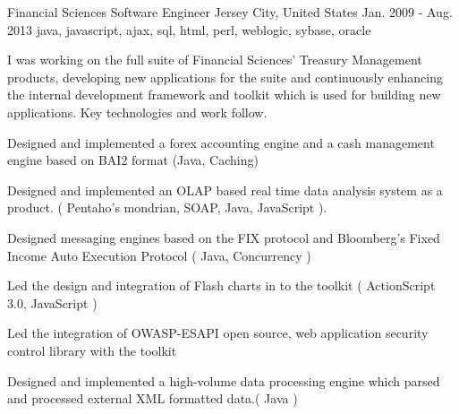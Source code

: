 \cventry
    {Financial Sciences} %
    {Software Engineer} %
    {Jersey City, United States} %
    {Jan. 2009 - Aug. 2013} %
    {java, javascript, ajax, sql, html, perl, weblogic, sybase, oracle} %
    {
        I was working on the full suite of Financial Sciences' Treasury Management products, developing new applications for the suite and continuously enhancing the
        internal development framework and toolkit which is used for building new applications. Key technologies and work follow.
    \begin{cvitems} %
        \item { Designed and implemented a forex accounting engine and a cash management engine based on BAI2 format (Java, Caching)}
        \item { Designed and implemented an OLAP based real time data analysis system as a product. ( Pentaho's mondrian, SOAP, Java, JavaScript ).}
        \item { Designed messaging engines based on the FIX protocol and Bloomberg's Fixed Income Auto Execution Protocol ( Java, Concurrency )}
        \item { Led the design and integration of Flash charts in to the toolkit ( ActionScript 3.0, JavaScript )}
        \item { Led the integration of OWASP-ESAPI open source, web application security control library with the toolkit}
        \item { Designed and implemented a high-volume data processing engine which parsed and processed external XML formatted data.( Java )}
    \end{cvitems}
    }